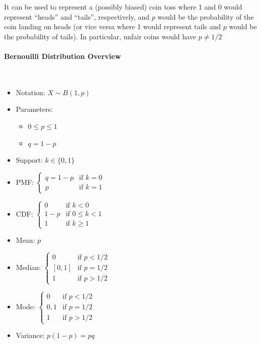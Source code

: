 \documentclass{article}
\begin{document}
It can be used to represent a (possibly biased) coin toss where 1 and 0 would represent “heads” and “tails”, respectively, and $p$ would be the probability of the coin landing on heads (or vice versa where 1 would represent tails and $p$ would be the probability of tails). In particular, unfair coins would have $p \neq  1/2 $

\paragraph{Bernouilli Distribution Overview}\mbox{} \\

\begin{itemize}
    \item Notation: $X \sim B(1,p)$
    \item Parameters: 
        \begin{itemize}
            \item $ 0 \leq p \leq 1 $
            \item $ q=1 - p $
        \end{itemize}
    \item Support: $ k\in \{0,1\} $
    \item PMF: $ \displaystyle {\begin{cases}q=1-p&{\text{if }}k=0\\p&{\text{if }}k=1\end{cases}} $
    \item CDF: $ \displaystyle {\begin{cases}0&{\text{if }}k<0\\1-p&{\text{if }}0\leq k<1\\1&{\text{if }}k\geq 1\end{cases}} $
    \item Mean: $p$
    \item Median: $ \displaystyle {\begin{cases}0&{\text{if }}p<1/2\\\left[0,1\right]&{\text{if }}p=1/2\\1&{\text{if }}p>1/2\end{cases}} $
    \item Mode: $ \displaystyle {\begin{cases}0&{\text{if }}p<1/2\\0,1&{\text{if }}p=1/2\\1&{\text{if }}p>1/2\end{cases}} $
    \item Variance: $ \displaystyle p(1-p)=pq $ 
\end{itemize}
\end{document}
